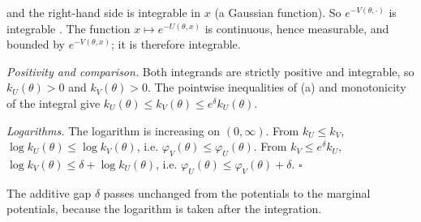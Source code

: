 \documentclass[11pt,a4paper]{report}
\begin{document}
and the right-hand side is integrable in \(x\) (a Gaussian function). So \(e^{-V(\theta,\cdot)}\) is integrable \cite[Section~3.9.2]{LangevinLean2026IPLA}. The function \(x\mapsto e^{-U(\theta,x)}\) is continuous, hence measurable, and bounded by \(e^{-V(\theta,x)}\); it is therefore integrable.




\emph{Positivity and comparison.} Both integrands are strictly positive and integrable, so \(k_U(\theta)>0\) and \(k_V(\theta)>0\). The pointwise inequalities of (a) and monotonicity of the integral give \(k_U(\theta)\le k_V(\theta)\le e^\delta k_U(\theta)\).




\emph{Logarithms.} The logarithm is increasing on \((0,\infty)\). From \(k_U\le k_V\), \(\log k_U(\theta)\le\log k_V(\theta)\), i.e. \(\varphi_V(\theta)\le\varphi_U(\theta)\). From \(k_V\le e^\delta k_U\), \(\log k_V(\theta)\le\delta+\log k_U(\theta)\), i.e. \(\varphi_U(\theta)\le\varphi_V(\theta)+\delta\). \(\square\)




The additive gap \(\delta\) passes unchanged from the potentials to the marginal potentials, because the logarithm is taken after the integration.
\end{document}
